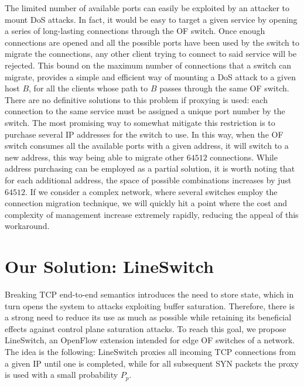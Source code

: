 \documentclass{sig-alternate}
\begin{document}
The limited number of available ports can easily be exploited by an attacker to mount DoS attacks. 
In fact, it would be easy to target a given service by opening a series of long-lasting connections through the OF switch. 
Once enough connections are opened and all the possible ports have been used by the switch to migrate the connections, 
any other client trying to connect to said service will be rejected.
This bound on the maximum number of connections that a switch can migrate, provides a simple and efficient 
way of mounting a DoS attack to a given host $B$, for all the clients whose path to $B$ passes through the same OF switch.
There are no definitive solutions to this problem if proxying is used: each connection to the same service must be assigned a unique port number by the switch.
The most promising way to somewhat mitigate this restriction is to purchase several IP addresses for the switch to use. 
In this way, when the OF switch consumes all the available ports with a given address, it will switch to a new address, this way being able to migrate other $64512$ connections.
While address purchasing can be employed as a partial solution, it is worth noting that for each additional address, the space of possible combinations increases by just $64512$. 
If we consider a complex network, where several switches employ the connection migration technique, 
we will quickly hit a point where the cost and complexity of management increase extremely rapidly, reducing the appeal of this workaround.





\section{Our Solution: LineSwitch}\label{sec:lineswitch}

Breaking TCP end-to-end semantics introduces the need to store state, which in turn opens the system to attacks exploiting buffer saturation. 
Therefore, there is a strong need to reduce its use as much as possible while retaining its beneficial effects against control plane saturation attacks.
To reach this goal, we propose LineSwitch, an OpenFlow extension intended for edge OF switches of a network. 
The idea is the following: LineSwitch proxies all incoming TCP connections from a given IP until one is completed, while for all subsequent SYN packets the proxy is used with a small probability $P_p$.
 
\end{document}
